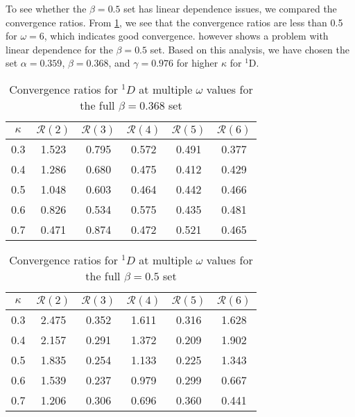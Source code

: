 \documentclass[Dissertation.tex]{subfiles}
\begin{document}
To see whether the $\beta = 0.5$ set has linear dependence issues, we compared
the convergence ratios. From \cref{tab:D1Beta368VarConv}, we see that the
convergence ratios are less than 0.5 for $\omega = 6$, which indicates good
convergence.  however shows a problem with linear
dependence for the $\beta = 0.5$ set. Based on this analysis, we have chosen
the set $\alpha = 0.359$, $\beta = 0.368$, and $\gamma = 0.976$ for higher
$\kappa$ for $^1$D.

\begin{table}[H]
\centering
\begin{tabular}{cccccc}
\toprule
$\kappa$ & $\mathcal{R}(2)$ & $\mathcal{R}(3)$ & $\mathcal{R}(4)$ & $\mathcal{R}(5)$ & $\mathcal{R}(6)$ \\
\midrule
0.3 & 1.523 & 0.795 & 0.572 & 0.491 & 0.377 \\
0.4 & 1.286 & 0.680 & 0.475 & 0.412 & 0.429 \\
0.5 & 1.048 & 0.603 & 0.464 & 0.442 & 0.466 \\
0.6 & 0.826 & 0.534 & 0.575 & 0.435 & 0.481 \\
0.7 & 0.471 & 0.874 & 0.472 & 0.521 & 0.465 \\
\bottomrule
\end{tabular}
\caption{Convergence ratios for $^1D$ at multiple $\omega$ values for the full $\beta = 0.368$ set}
\label{tab:D1Beta368VarConv}
\end{table}


\begin{table}[H]
\centering
\begin{tabular}{cccccc}
\toprule
$\kappa$ & $\mathcal{R}(2)$ & $\mathcal{R}(3)$ & $\mathcal{R}(4)$ & $\mathcal{R}(5)$ & $\mathcal{R}(6)$ \\
\midrule
0.3 & 2.475 & 0.352 & 1.611 & 0.316 & 1.628 \\
0.4 & 2.157 & 0.291 & 1.372 & 0.209 & 1.902 \\
0.5 & 1.835 & 0.254 & 1.133 & 0.225 & 1.343 \\
0.6 & 1.539 & 0.237 & 0.979 & 0.299 & 0.667 \\
0.7 & 1.206 & 0.306 & 0.696 & 0.360 & 0.441 \\
\bottomrule
\end{tabular}
\caption{Convergence ratios for $^1D$ at multiple $\omega$ values for the full $\beta = 0.5$ set}
\label{tab:D1Beta5VarConv}
\end{table}
\end{document}
